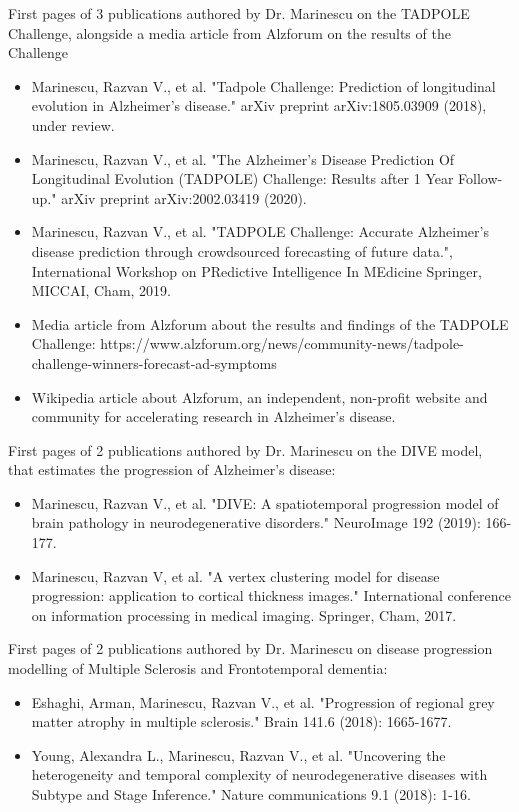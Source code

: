 \documentclass[11pt]{article}
\begin{document}
\begin{thebibliography}{9}
First pages of 3 publications authored by Dr. Marinescu on the TADPOLE Challenge, alongside a media article from Alzforum on the results of the Challenge
\begin{itemize}
 \item Marinescu, Razvan V., et al. "Tadpole Challenge: Prediction of longitudinal evolution in Alzheimer's disease." arXiv preprint arXiv:1805.03909 (2018), under review.
 \item Marinescu, Razvan V., et al. "The Alzheimer's Disease Prediction Of Longitudinal Evolution (TADPOLE) Challenge: Results after 1 Year Follow-up." arXiv preprint arXiv:2002.03419 (2020).
 \item Marinescu, Razvan V., et al. "TADPOLE Challenge: Accurate Alzheimer’s disease prediction through crowdsourced forecasting of future data.", International Workshop on PRedictive Intelligence In MEdicine Springer, MICCAI, Cham, 2019.
 \item Media article from Alzforum about the results and findings of the TADPOLE Challenge: https://www.alzforum.org/news/community-news/tadpole-challenge-winners-forecast-ad-symptoms
 \item Wikipedia article about Alzforum, an independent, non-profit website and community for accelerating research in Alzheimer's disease.
\end{itemize}


First pages of 2 publications authored by Dr. Marinescu on the DIVE model, that estimates the progression of Alzheimer's disease:
\begin{itemize}
 \item Marinescu, Razvan V., et al. "DIVE: A spatiotemporal progression model of brain pathology in neurodegenerative disorders." NeuroImage 192 (2019): 166-177.
 \item Marinescu, Razvan V, et al. "A vertex clustering model for disease progression: application to cortical thickness images." International conference on information processing in medical imaging. Springer, Cham, 2017.
\end{itemize}

First pages of 2 publications authored by Dr. Marinescu on disease progression modelling of Multiple Sclerosis and Frontotemporal dementia:
\begin{itemize}
 \item Eshaghi, Arman, Marinescu, Razvan V., et al. "Progression of regional grey matter atrophy in multiple sclerosis." Brain 141.6 (2018): 1665-1677.
 \item Young, Alexandra L., Marinescu, Razvan V., et al. "Uncovering the heterogeneity and temporal complexity of neurodegenerative diseases with Subtype and Stage Inference." Nature communications 9.1 (2018): 1-16.
\end{itemize}



\end{thebibliography}
\end{document}
